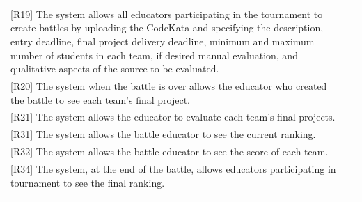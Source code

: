 \clearpage
\begin{tabular}{|p{7.5cm}|p{7.5cm}|}
\hline
{[R19] The system allows all educators participating in the tournament to create battles by uploading the CodeKata and specifying the description, entry deadline, final project delivery deadline, minimum and maximum number of students in each team, if desired manual evaluation, and qualitative
aspects of the source to be evaluated.}
& \\

{[R20] The system when the battle is over allows the educator who created the battle to see each team’s final project.}
& \\

{[R21] The system allows the educator to evaluate each team’s final projects.}
& \\

{[R31] The system allows the battle educator to see the current ranking.}
& \\

{[R32] The system allows the battle educator to see the score of each team.}
& \\

{[R34] The system, at the end of the battle, allows educators participating in tournament to see the final ranking.}
& \\


\vspace{2pt}&\vspace{2pt}\\
\hline
\end{tabular}
\raggedright
\vspace{2\baselineskip}


